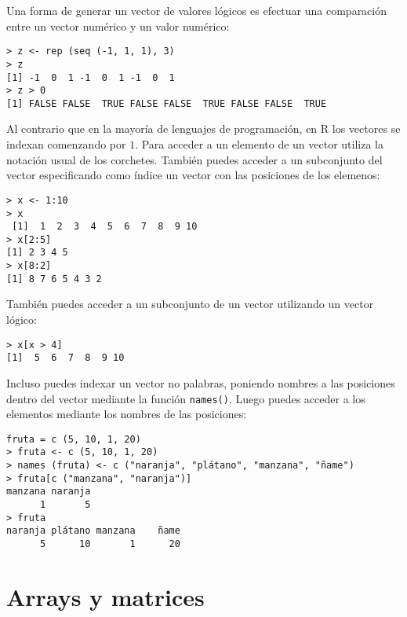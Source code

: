 Una forma  de generar  un vector  de valores  lógicos es  efectuar una
comparación entre un vector numérico y un valor numérico:

\begin{verbatim}
> z <- rep (seq (-1, 1, 1), 3)
> z
[1] -1  0  1 -1  0  1 -1  0  1
> z > 0
[1] FALSE FALSE  TRUE FALSE FALSE  TRUE FALSE FALSE  TRUE
\end{verbatim}

Al contrario que  en la mayoría de lenguajes de  programación, en {\sf
R}  los vectores  se indexan  comenzando por  $1$. Para  acceder a  un
elemento  de un  vector utiliza  la notación  usual de  los corchetes.
También puedes acceder a un  subconjunto del vector especificando como
índice un vector con las posiciones de los elemenos:


\begin{verbatim}
> x <- 1:10
> x
 [1]  1  2  3  4  5  6  7  8  9 10
> x[2:5]
[1] 2 3 4 5
> x[8:2]
[1] 8 7 6 5 4 3 2
\end{verbatim}

También puedes  acceder a  un subconjunto de  un vector  utilizando un
vector lógico:

\begin{verbatim}
> x[x > 4]
[1]  5  6  7  8  9 10
\end{verbatim}

Incluso puedes indexar  un vector no palabras, poniendo  nombres a las
posiciones dentro del vector mediante  la función {\tt names()}. Luego
puedes acceder a los elementos mediante los nombres de las posiciones:


\begin{verbatim}
fruta = c (5, 10, 1, 20)
> fruta <- c (5, 10, 1, 20)
> names (fruta) <- c ("naranja", "plátano", "manzana", "ñame")
> fruta[c ("manzana", "naranja")]
manzana naranja 
      1       5 
> fruta
naranja plátano manzana    ñame 
      5      10       1      20 
\end{verbatim}

\section{Arrays y matrices}


